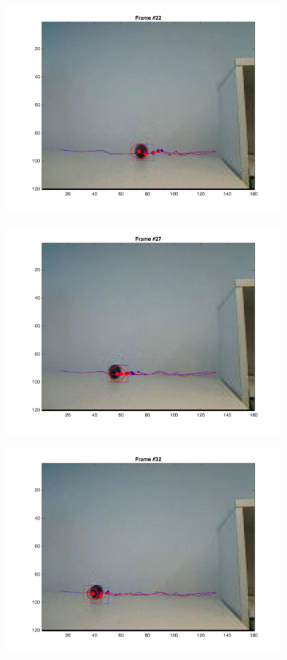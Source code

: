 \documentclass{ethz_report}
\begin{document}
\begin{figure}[h]
\begin{subfigure}[b]{.25\textwidth}
        \includegraphics[width=1\linewidth]{images/video3__21}
    \end{subfigure}%
    \begin{subfigure}[b]{.25\textwidth}
        \centering
        \includegraphics[width=1\linewidth]{images/video3__26}
    \end{subfigure}%
    \begin{subfigure}[b]{.25\textwidth}
        \centering
        \includegraphics[width=1\linewidth]{images/video3__31}

\end{subfigure}
\end{figure}
\end{document}
